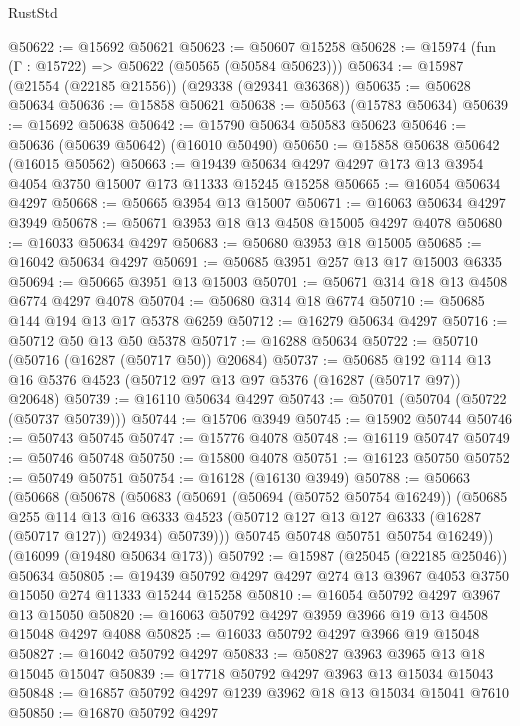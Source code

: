 \begin{lexlean}{RustStd}
\begin{coremodule}
@50622 := @15692 @50621
@50623 := @50607 @15258
@50628 := @15974 (fun (Γ : @15722) => @50622 (@50565 (@50584 @50623)))
@50634 := @15987 (@21554 (@22185 @21556)) (@29338 (@29341 @36368))
@50635 := @50628 @50634
@50636 := @15858 @50621
@50638 := @50563 (@15783 @50634)
@50639 := @15692 @50638
@50642 := @15790 @50634 @50583 @50623
@50646 := @50636 (@50639 @50642) (@16010 @50490)
@50650 := @15858 @50638 @50642 (@16015 @50562)
@50663 := @19439 @50634 @4297 @4297 @173 @13 @3954 @4054 @3750 @15007 @173 @11333 @15245 @15258
@50665 := @16054 @50634 @4297
@50668 := @50665 @3954 @13 @15007
@50671 := @16063 @50634 @4297 @3949
@50678 := @50671 @3953 @18 @13 @4508 @15005 @4297 @4078
@50680 := @16033 @50634 @4297
@50683 := @50680 @3953 @18 @15005
@50685 := @16042 @50634 @4297
@50691 := @50685 @3951 @257 @13 @17 @15003 @6335
@50694 := @50665 @3951 @13 @15003
@50701 := @50671 @314 @18 @13 @4508 @6774 @4297 @4078
@50704 := @50680 @314 @18 @6774
@50710 := @50685 @144 @194 @13 @17 @5378 @6259
@50712 := @16279 @50634 @4297
@50716 := @50712 @50 @13 @50 @5378
@50717 := @16288 @50634
@50722 := @50710 (@50716 (@16287 (@50717 @50)) @20684)
@50737 := @50685
    @192
    @114
    @13
    @16
    @5376
    @4523
    (@50712 @97 @13 @97 @5376 (@16287 (@50717 @97)) @20648)
@50739 := @16110 @50634 @4297
@50743 := @50701 (@50704 (@50722 (@50737 @50739)))
@50744 := @15706 @3949
@50745 := @15902 @50744
@50746 := @50743 @50745
@50747 := @15776 @4078
@50748 := @16119 @50747
@50749 := @50746 @50748
@50750 := @15800 @4078
@50751 := @16123 @50750
@50752 := @50749 @50751
@50754 := @16128 (@16130 @3949)
@50788 := @50663
    (@50668
      (@50678
        (@50683
          (@50691
            (@50694 (@50752 @50754 @16249))
            (@50685
              @255
              @114
              @13
              @16
              @6333
              @4523
              (@50712 @127 @13 @127 @6333 (@16287 (@50717 @127)) @24934)
              @50739)))
        @50745
        @50748
        @50751
        @50754
        @16249))
    (@16099 (@19480 @50634 @173))
@50792 := @15987 (@25045 (@22185 @25046)) @50634
@50805 := @19439 @50792 @4297 @4297 @274 @13 @3967 @4053 @3750 @15050 @274 @11333 @15244 @15258
@50810 := @16054 @50792 @4297 @3967 @13 @15050
@50820 := @16063 @50792 @4297 @3959 @3966 @19 @13 @4508 @15048 @4297 @4088
@50825 := @16033 @50792 @4297 @3966 @19 @15048
@50827 := @16042 @50792 @4297
@50833 := @50827 @3963 @3965 @13 @18 @15045 @15047
@50839 := @17718 @50792 @4297 @3963 @13 @15034 @15043
@50848 := @16857 @50792 @4297 @1239 @3962 @18 @13 @15034 @15041 @7610
@50850 := @16870 @50792 @4297

\end{coremodule}
\end{lexlean}
